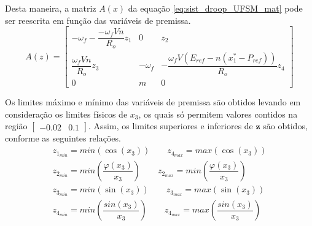 Desta maneira, a matriz $A(x)$ da equação \ref{eq:sist_droop_UFSM_mat} pode ser reescrita em função das variáveis de premissa.
\begin{equation}\label{eq:A_z}
A(z) = \begin{bmatrix}-\omega_f - \dfrac{-\omega_fVn}{R_o}z_1&0&z_2\\
\dfrac{\omega_fVn}{R_o}z_3&-\omega_f&-\dfrac{\omega_fV(E_{ref}-n(x_1^*-P_{ref}))}{R_o}z_4\\
0&m&0\end{bmatrix}
\end{equation}

Os limites máximo e mínimo das variáveis de premissa são obtidos levando em consideração os limites físicos de $x_3$, os quais só permitem valores contidos na região $\begin{bmatrix}-0.02&0.1\end{bmatrix}$. Assim, os limites superiores e inferiores de $\textbf{z}$ são obtidos, conforme as seguintes relações.
\begin{equation*}
\begin{gathered}
z_{1_{min}} = min(\cos(x_3)) \qquad  z_{4_{max}} = max(\cos(x_3))\\
z_{2_{min}} = min(\dfrac{\varphi(x_3)}{x_3}) \qquad  z_{2_{max}} = min(\dfrac{\varphi(x_3)}{x_3})\\
z_{3_{min}} = min(\sin(x_3)) \qquad  z_{3_{max}} = max(\sin(x_3))\\
z_{4_{min}} = min(\dfrac{sin(x_3)}{x_3}) \qquad z_{4_{max}} = max(\dfrac{sin(x_3)}{x_3})
\end{gathered}
\end{equation*}

